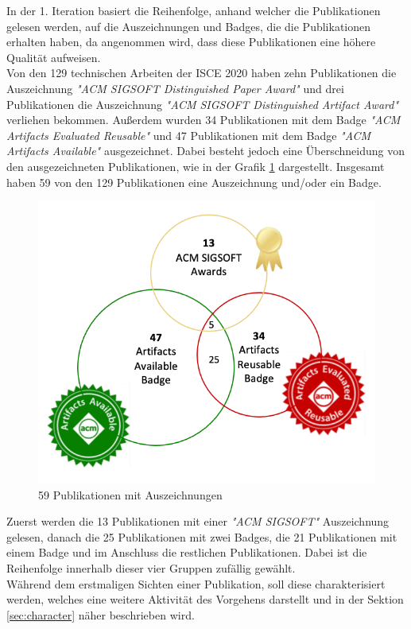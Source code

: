 In der 1. Iteration basiert die Reihenfolge, anhand welcher die Publikationen gelesen werden, auf die Auszeichnungen und Badges, die die Publikationen erhalten haben, da angenommen wird, dass diese Publikationen eine höhere Qualität aufweisen. \\
Von den 129 technischen Arbeiten der ISCE 2020 haben zehn Publikationen die Auszeichnung \textit{"ACM SIGSOFT Distinguished Paper Award"} und drei Publikationen die Auszeichnung \textit{"ACM SIGSOFT Distinguished Artifact Award"} verliehen bekommen.
Außerdem wurden 34 Publikationen mit dem Badge \textit{"ACM Artifacts Evaluated Reusable"} und 47 Publikationen mit dem Badge \textit{"ACM Artifacts Available"} ausgezeichnet.
Dabei besteht jedoch eine Überschneidung von den ausgezeichneten Publikationen, wie in der Grafik \ref{img:awards} dargestellt.
Insgesamt haben 59 von den 129 Publikationen eine Auszeichnung und/oder ein Badge. \\

\begin{figure}[thb]
    \centering
    \includegraphics[clip,width=0.6\linewidth]{content/images/03-Awards}
    \caption{59 Publikationen mit Auszeichnungen}
    \label{img:awards}
\end{figure}

Zuerst werden die 13 Publikationen mit einer \textit{"ACM SIGSOFT"} Auszeichnung gelesen, danach die 25 Publikationen mit zwei Badges, die 21 Publikationen mit einem Badge und im Anschluss die restlichen Publikationen. Dabei ist die Reihenfolge innerhalb dieser vier Gruppen zufällig gewählt. \\

Während dem erstmaligen Sichten einer Publikation, soll diese charakterisiert werden, welches eine weitere Aktivität des Vorgehens darstellt und in der Sektion \ref{sec:character} näher beschrieben wird.\\

